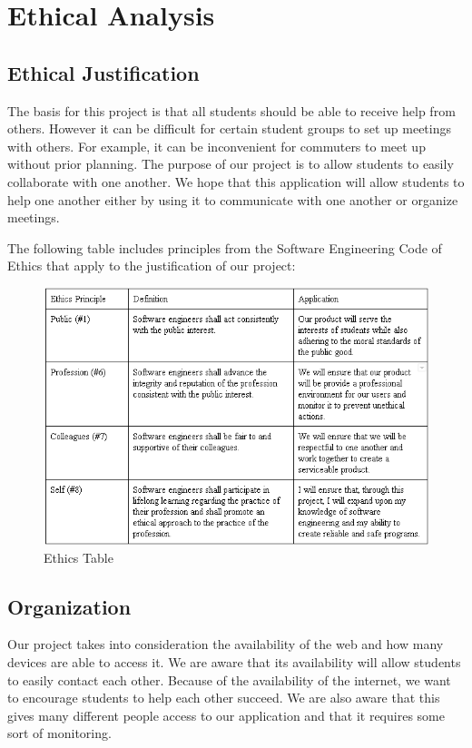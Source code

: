 \chapter{Ethical Analysis}

\section{Ethical Justification}
The basis for this project is that all students should be able to receive help from others. However it can be difficult for certain student groups to set up meetings with others. For example, it can be inconvenient for commuters to meet up without prior planning. The purpose of our project is to allow students to easily collaborate with one another. We hope that this application will allow students to help one another either by using it to communicate with one another or organize meetings.

The following table includes principles from the Software Engineering Code of Ethics that apply to the justification of our project:

\begin{figure}[h]
	\centering
	\includegraphics[scale=0.8]{images/ethics_table.png}
	\caption{Ethics Table}
	\label{fig:ethics table}
\end{figure}

\section{Organization}
Our project takes into consideration the availability of the web and how many devices are able to access it. We are aware that its availability will allow students to easily contact each other. Because of the availability of the internet, we want to encourage students to help each other succeed. We are also aware that this gives many different people access to our application and that it requires some sort of monitoring. 

